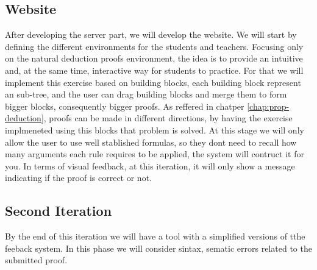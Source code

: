 \subsection{Website}
After developing the server part, we will develop the website. We will start by defining the different environments for the students and teachers. Focusing only on the natural deduction proofs environment, the idea is to provide an intuitive and, at the same time, interactive way for students to practice. For that we will implement this exercise based on building blocks, each building block represent an sub-tree, and the user can drag building blocks and merge them to form bigger blocks, consequently bigger proofs. As reffered in chatper \ref{chap:prop-deduction}, proofs can be made in different directions, by having the exercise implmeneted using this blocks that problem is solved. At this stage we will only allow the user to use well stablished formulas, so they dont need to recall how many arguments each rule requires to be applied, the system will contruct it for you. In terms of visual feedback, at this iteration, it will only show a message indicating if the proof is correct or not.

\subsection{Second Iteration}
By the end of this iteration we will have a tool with a simplified versions of tthe feeback system. In this phase we will consider sintax, sematic errors related to the submitted proof.

